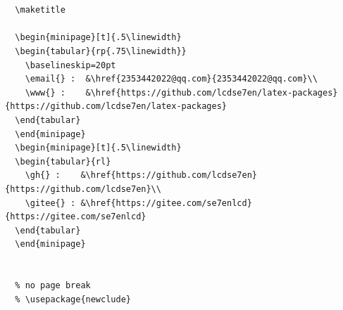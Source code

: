 \begin{verbatim}
  

  \maketitle

  \begin{minipage}[t]{.5\linewidth}
  \begin{tabular}{rp{.75\linewidth}}
    \baselineskip=20pt
    \email{} :  &\href{2353442022@qq.com}{2353442022@qq.com}\\
    \www{} :    &\href{https://github.com/lcdse7en/latex-packages}{https://github.com/lcdse7en/latex-packages}
  \end{tabular}
  \end{minipage}
  \begin{minipage}[t]{.5\linewidth}
  \begin{tabular}{rl}
    \gh{} :    &\href{https://github.com/lcdse7en}{https://github.com/lcdse7en}\\
    \gitee{} : &\href{https://gitee.com/se7enlcd}{https://gitee.com/se7enlcd}
  \end{tabular}
  \end{minipage}


  % no page break
  % \usepackage{newclude}
  

  
  
  
  
  

  
\end{verbatim}

\newpage
